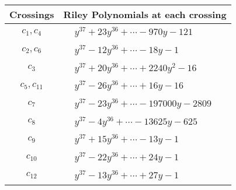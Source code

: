 \documentclass[1p]{elsarticle_modified}
\theoremstyle{definition}
\begin{document}
\begin{tabular}{m{50pt}|m{274pt}}
Crossings & \hspace{64pt}Riley Polynomials at each crossing \\
\hline $$\begin{aligned}c_{1},c_{4}\end{aligned}$$&$\begin{aligned}
&y^{37}+23 y^{36}+\cdots-970 y-121
\end{aligned}$\\
\hline $$\begin{aligned}c_{2},c_{6}\end{aligned}$$&$\begin{aligned}
&y^{37}-12 y^{36}+\cdots-18 y-1
\end{aligned}$\\
\hline $$\begin{aligned}c_{3}\end{aligned}$$&$\begin{aligned}
&y^{37}+20 y^{36}+\cdots+2240 y^2-16
\end{aligned}$\\
\hline $$\begin{aligned}c_{5},c_{11}\end{aligned}$$&$\begin{aligned}
&y^{37}-26 y^{36}+\cdots+16 y-16
\end{aligned}$\\
\hline $$\begin{aligned}c_{7}\end{aligned}$$&$\begin{aligned}
&y^{37}-23 y^{36}+\cdots-197000 y-2809
\end{aligned}$\\
\hline $$\begin{aligned}c_{8}\end{aligned}$$&$\begin{aligned}
&y^{37}-4 y^{36}+\cdots-13625 y-625
\end{aligned}$\\
\hline $$\begin{aligned}c_{9}\end{aligned}$$&$\begin{aligned}
&y^{37}+15 y^{36}+\cdots-13 y-1
\end{aligned}$\\
\hline $$\begin{aligned}c_{10}\end{aligned}$$&$\begin{aligned}
&y^{37}-22 y^{36}+\cdots+24 y-1
\end{aligned}$\\
\hline $$\begin{aligned}c_{12}\end{aligned}$$&$\begin{aligned}
&y^{37}-13 y^{36}+\cdots+27 y-1
\end{aligned}$\\
\hline
\end{tabular}\\~\\
\end{document}
